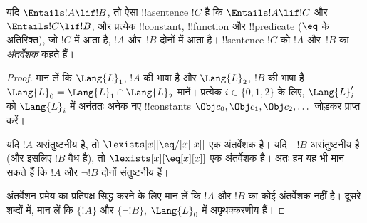 \documentclass[../../../include/open-logic-section]{subfiles}
\begin{document}


\begin{thm}[क्रेग का अंतर्वेशन प्रमेय]
यदि $\Entails !A \lif !B$, तो ऐसा !!a{sentence} $!C$ है कि
$\Entails !A \lif !C$ और $\Entails !C \lif !B$, और प्रत्येक
!!{constant}, !!{function} और !!{predicate} ($\eq$ के अतिरिक्त), जो
$!C$ में आता है, $!A$ और~$!B$ दोनों में आता है। !!{sentence} $!C$ को
$!A$ और~$!B$ का
\emph{अंतर्वेशक} कहते हैं।
\end{thm}

\begin{proof}
मान लें कि $\Lang{L}_1$, $!A$ की भाषा है और $\Lang{L}_2$, $!B$ की भाषा
है। $\Lang{L}_0 = \Lang{L}_1 \cap \Lang{L}_2$ मानें। प्रत्येक
$i \in \{0, 1, 2 \}$ के लिए, $\Lang{L}'_i$ को $\Lang{L}_i$ में अनंततः
अनेक नए !!{constant}s $\Obj c_0,
\Obj c_1, \Obj c_2, \dots$ जोड़कर
प्राप्त करें।

यदि $!A$ असंतुष्टनीय है, तो $\lexists[x][\eq/[x][x]]$ एक अंतर्वेशक है।
यदि $\lnot !B$ असंतुष्टनीय है (और इसलिए $!B$ वैध है), तो
$\lexists[x][\eq[x][x]]$ एक अंतर्वेशक है। अतः हम यह भी मान सकते हैं कि
$!A$ और $\lnot !B$ दोनों संतुष्टनीय हैं।

अंतर्वेशन प्रमेय का प्रतिपक्ष सिद्ध करने के लिए मान लें कि $!A$ और $!B$
का कोई अंतर्वेशक नहीं है। दूसरे शब्दों में, मान लें कि $\{!A\}$ और
$\{\lnot !B\}$, $\Lang{L}_0$ में अपृथक्करणीय हैं।


\end{proof}
\end{document}
